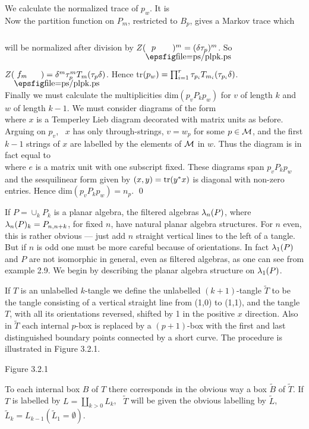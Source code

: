 We calculate the normalized trace of $p_w$. It is 
\[
	
\]
Now the partition function on $P_m$, restricted to $B_p$,
gives a Markov trace which will be normalized after division by
$Z(\blright{p} )^m=(\d\tau_p)^m$. So
$Z(\blright{f_m})=\d^m\tau_p^m T_m(\tau_{p}\d)$.
Hence tr$(p_w)=\prod^r_{i=1} \tau_{p_i}T_{m_i}(\tau_{p_i}\delta)$.

Finally we must calculate the multiplicities dim$(p_vP_kp_w)$ for
$v$ of length $k$ and $w$ of length $k-1$. We must consider
diagrams of the form
\[
	
\]
\ni where $x$ is a Temperley Lieb diagram decorated with matrix
units as before. Arguing on $p_v$, \ $x$ has only through-strings,
$v=w_p$ for some $p\in{\cal M}$, and the first $k-1$ strings of $x$
are labelled by the elements of $\cal M$ in $w$. Thus the diagram
is in fact equal to
\[
	
\]
\ni where $e$ is a matrix unit with one subscript fixed.
These diagrams span $p_v P_k p_w$ and the sesquilinear form given
by $(x,y)={\bf\rm{tr}}(y^*x)$ is diagonal with non-zero entries.
Hence dim$(p_vP_kp_w)=n_p$. \qed

\bs{}

If $P=\cup_k P_k$ is  a planar algebra, the filtered algebras
$\lambda_n(P)$, where $\lambda_n(P)_k=P_{n,n+k}$, for fixed $n$, have
natural planar algebra structures. For $n$ even, this is rather
obvious --- just add $n$ straight vertical lines to the left of a
tangle. But if $n$ is odd one must be more careful because of
orientations. In fact $\lambda_1(P)$ and $P$ are not isomorphic in
general, even as filtered algebras, as one can see from example
2.9. We begin by describing the planar algebra structure on
$\lambda_1(P)$.

If $T$ is an unlabelled $k$-tangle we define the unlabelled
$(k+1)$-tangle $\tilde T$ to be the tangle consisting of a vertical
straight line from (1,0) to (1,1), and the tangle $T$, with all its
orientations reversed, shifted by 1 in the positive $x$ direction.
Also in $\tilde T$ each internal $p$-box is replaced by a
$(p+1)$-box with the first and last distinguished boundary points
connected by a short curve.  The procedure is illustrated in Figure 3.2.1.
\[
	
\]
\begin{center}
Figure 3.2.1
\end{center}
\bs
To each internal box $B$ of $T$ there corresponds in the obvious
way a box $\tilde B$ of $\tilde T$. If $T$ is labelled by
$L=\coprod_{k > 0} L_k$, \
$\tilde T$ will be given the obvious labelling by $\tilde L$, \
$\tilde L_k= L_{k-1}(\tilde L_1=\emptyset)$.


